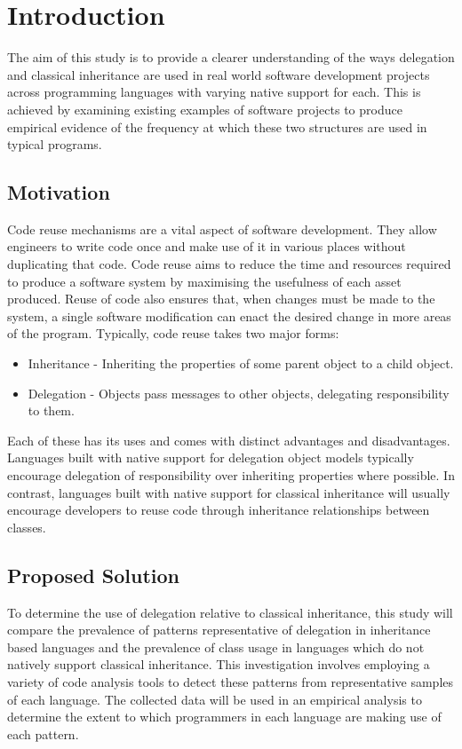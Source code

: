 \chapter{Introduction}\label{C:intro}
The aim of this study is to provide a clearer understanding of the ways delegation and classical inheritance are used in real world software development projects across programming languages with varying native support for each. This is achieved by examining existing examples of software projects to produce empirical evidence of the frequency at which these two structures are used in typical programs.

\section{Motivation}
Code reuse mechanisms are a vital aspect of software development. They allow engineers to write code once and make use of it in various places without duplicating that code. Code reuse aims to reduce the time and resources required to produce a software system by maximising the usefulness of each asset produced. Reuse of code also ensures that, when changes must be made to the system, a single software modification can enact the desired change in more areas of the program.
\newline
Typically, code reuse takes two major forms:
\begin{itemize}
	\item Inheritance - Inheriting the properties of some parent object to a child object.
	\item Delegation - Objects pass messages to other objects, delegating responsibility to them.
\end{itemize}
Each of these has its uses and comes with distinct advantages and disadvantages. Languages built with native support for delegation object models typically encourage delegation of responsibility over inheriting properties where possible. In contrast, languages built with native support for classical inheritance will usually encourage developers to reuse code through inheritance relationships between classes.

\section{Proposed Solution}
To determine the use of delegation relative to classical inheritance, this study will compare the prevalence of patterns representative of delegation in inheritance based languages and the prevalence of class usage in languages which do not natively support classical inheritance. This investigation involves employing a variety of code analysis tools to detect these patterns from representative samples of each language. The collected data will be used in an empirical analysis to determine the extent to which programmers in each language are making use of each pattern.

